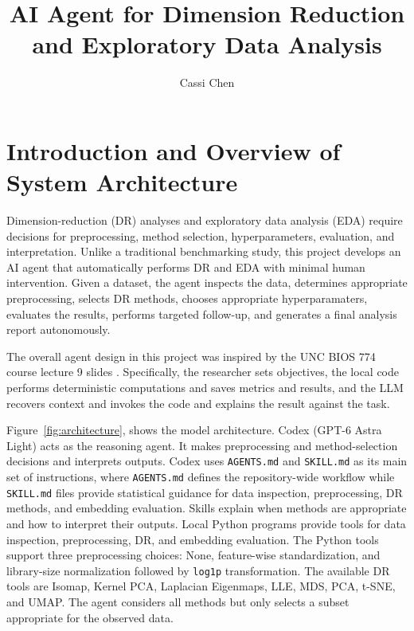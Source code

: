 \documentclass[10pt]{article}
\title{\vspace{-1.5cm}
AI Agent for Dimension Reduction and Exploratory Data Analysis
}
\author{Cassi Chen}
\date{}
\begin{document}
\maketitle
\vspace{-0.7cm}


\section{Introduction and Overview of System Architecture}

Dimension-reduction (DR) analyses and exploratory data analysis (EDA) require decisions for preprocessing, method selection, hyperparameters, evaluation, and interpretation. Unlike a traditional benchmarking study, this project develops an AI agent that automatically performs DR and EDA with minimal human intervention. Given a dataset, the agent inspects the data, determines appropriate preprocessing, selects DR methods, chooses appropriate hyperparamaters, evaluates the results, performs targeted follow-up, and generates a final analysis report autonomously.

The overall agent design in this project was inspired by the UNC BIOS 774 course lecture 9 slides \cite{bios774slides}. Specifically, the researcher sets objectives, the local code performs deterministic computations and saves metrics and results, and the LLM recovers context and invokes the code and explains the result against the task.

Figure~\ref{fig:architecture}, shows the model architecture. Codex (GPT-6 Astra Light) acts as the reasoning agent. It makes preprocessing and method-selection decisions and interprets outputs. Codex uses \texttt{AGENTS.md} and \texttt{SKILL.md} as its main set of instructions, where \texttt{AGENTS.md} defines the repository-wide workflow while \texttt{SKILL.md} files provide statistical guidance for data inspection, preprocessing, DR methods, and embedding evaluation. Skills explain when methods are appropriate and how to interpret their outputs. Local Python programs provide tools for data inspection, preprocessing, DR, and embedding evaluation. The Python tools support three preprocessing choices: None, feature-wise standardization, and library-size normalization followed by \texttt{log1p} transformation. The available DR tools are Isomap, Kernel PCA, Laplacian Eigenmaps, LLE, MDS, PCA, t-SNE, and UMAP. The agent considers all methods but only selects a subset appropriate for the observed data.  
\end{document}
